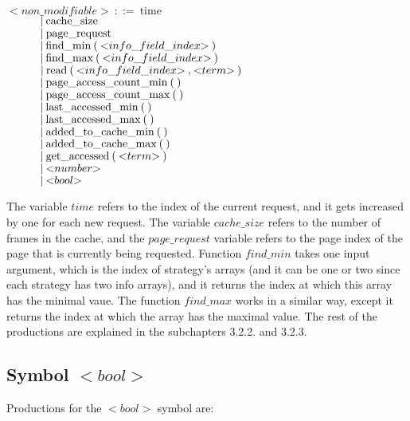 \noindent
$ {<}non\_modifiable{>}\:::=\:\text{time} $\\
$ \indent\indent |\:\text{cache\_size} $\\
$ \indent\indent |\:\text{page\_request} $\\
$ \indent\indent |\:\text{find\_min}\:\text{(}\:{<}info\_field\_index{>}\:\text{)} $\\
$ \indent\indent |\:\text{find\_max}\:\text{(}\:{<}info\_field\_index{>}\:\text{)} $\\
$ \indent\indent |\:\text{read}\:\text{(}\:{<}info\_field\_index{>}\:\text{,}\:{<}term{>}\:\text{)} $\\
$ \indent\indent |\:\text{page\_access\_count\_min}\:\text{(}\:\text{)}$\\
$ \indent\indent |\:\text{page\_access\_count\_max}\:\text{(}\:\text{)}$\\
$ \indent\indent |\:\text{last\_accessed\_min}\:\text{(}\:\text{)}$\\
$ \indent\indent |\:\text{last\_accessed\_max}\:\text{(}\:\text{)}$\\
$ \indent\indent |\:\text{added\_to\_cache\_min}\:\text{(}\:\text{)}$\\
$ \indent\indent |\:\text{added\_to\_cache\_max}\:\text{(}\:\text{)}$\\
$ \indent\indent |\:\text{get\_accessed}\:\text{(}\:{<}term{>}\:\text{)}$\\
$ \indent\indent |\:{<}number{>} $\\
$ \indent\indent |\:{<}bool{>} $

The variable $time$ refers to the index of the current request, and it gets increased by one for each new request. The variable $cache\_size$ refers to the number of frames in the cache, and the $page\_request$ variable refers to the page index of the page that is currently being requested. Function $find\_min$ takes one input argument, which is the index of strategy's arrays (and it can be one or two since each strategy has two info arrays), and it returns the index at which this array has the minimal vaue. The function $find\_max$ works in a similar way, except it returns the index at which the array has the maximal value. The rest of the productions are explained in the subchapters 3.2.2. and 3.2.3.

\subsection{Symbol ${<}bool{>}$}
Productions for the ${<}bool{>}$ symbol are:

